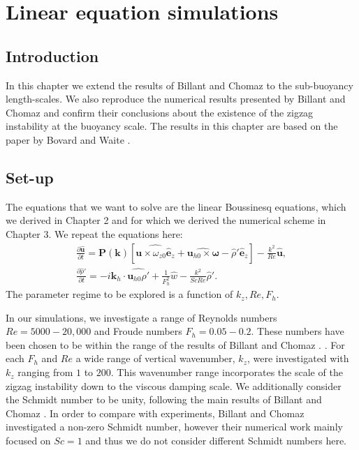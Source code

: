 \chapter{Linear equation simulations}

\section{Introduction}
In this chapter we extend the results of Billant and Chomaz \cite{bc2000c} to the sub-buoyancy length-scales. We also reproduce the numerical results presented by Billant and Chomaz and confirm their conclusions about the existence of the zigzag instability at the buoyancy scale. The results in this chapter are based on the paper by Bovard and Waite \cite{bovard2013}.

\section{Set-up}
The equations that we want to solve are the linear Boussinesq equations, which we derived in Chapter 2 and for which we derived the numerical scheme in Chapter 3. We repeat the equations here:
\begin{align}
\frac{\partial \hat{\bm{u}}}{\partial t} = \textbf{P}(\textbf{k})[\widehat{\bm{u}\times \omega_{z0}\hat{\bm{e}}_{z}} + \widehat{\bm{u}_{h0}\times\bm{\omega}}-\hat{\rho}'\hat{\bm{e}}_{z}] - \frac{k^{2}}{Re}\hat{\bm{u}},\\
\frac{\partial\hat{\rho}'}{\partial t} = -i\bm{k}_{h}\cdot\widehat{\bm{u}_{h0}\rho'} + \frac{1}{F_{h}^{2}}\hat{w}- \frac{k^{2}}{ScRe}\hat{\rho}'.
\end{align} 
The parameter regime to be explored is a function of $k_{z},Re,F_{h}$. 

In our simulations, we investigate a range of Reynolds numbers $Re=5000-20{,}000$ and Froude numbers $F_{h}=0.05-0.2$. These numbers have been chosen to be within the range of the results of Billant and Chomaz \cite{bc2000c}. . For each $F_{h}$ and $Re$ a wide range of vertical wavenumber, $k_{z}$, were investigated with $k_{z}$ ranging from $1$ to $200$. This wavenumber range incorporates the scale of the zigzag instability down to the viscous damping scale. We additionally consider the Schmidt number to be unity, following the main results of Billant and Chomaz \cite{bc2000c}. In order to compare with experiments, Billant and Chomaz investigated a non-zero Schmidt number, however their numerical work mainly focused on $Sc=1$ and thus we do not consider different Schmidt numbers here. 

